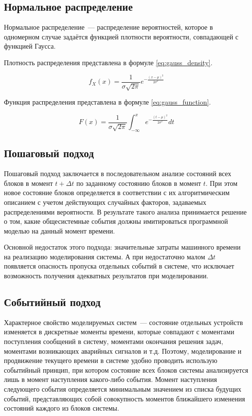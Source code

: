 \documentclass[a4paper, 12pt]{article}
\begin{document}
\subsection{Нормальное распределение}

\hspace*{5mm} Нормальное распределение~--- распределение вероятностей, которое в одномерном случае задаётся функцией плотности вероятности, совпадающей с функцией Гаусса.

Плотность распределения представлена в формуле \ref{eq:gauss_density}.

\begin{equation}\label{eq:gauss_density}
	f_X (x) = \frac{1}{\sigma \sqrt{2 \pi}} e^{-\frac{(x - \mu)^2}{2 \sigma^2}}
\end{equation}

Функция распределения представлена в формуле \ref{eq:gauss_function}.

\begin{equation}\label{eq:gauss_function}
	F (x) = \frac{1}{\sigma \sqrt{2\pi}} \int_{-\infty}^x e^{-\frac{(t- \mu)^2}{2 \sigma^2}} dt
\end{equation}

\subsection{Пошаговый подход}
\hspace*{5mm} Пошаговый подход заключается в последовательном анализе состояний всех блоков в момент $t + \Delta t$ по заданному состоянию блоков в момент $t$. При этом новое состояние блоков определяется в соответствии с их алгоритмическим описанием с учетом действующих случайных факторов, задаваемых распределениями вероятности. В результате такого анализа принимается решение о том, какие общесистемные события должны имитироваться программной моделью на данный момент времени.

\hspace*{5mm} Основной недостаток этого подхода: значительные затраты машинного времени на реализацию моделирования системы. А при недостаточно малом $\Delta t$ появляется опасность пропуска отдельных событий в системе, что исключает возможность получения адекватных результатов при моделировании.

\subsection{Событийный подход}
\hspace*{5mm} Характерное свойство моделируемых систем~--- состояние отдельных устройств изменяется в дискретные моменты времени, которые совпадают с моментами поступления сообщений в систему, моментами окончания решения задач, моментами возникающих аварийных сигналов и т.д. Поэтому, моделирование и продвижение текущего времени в системе удобно проводить использую событийный принцип, при котором состояние всех блоков системы анализируется лишь в момент наступления какого-либо события. Момент наступления следующего события определяется минимальным значением из списка будущих событий, представляющих собой совокупность моментов ближайшего изменения состояний каждого из блоков системы.
\end{document}
